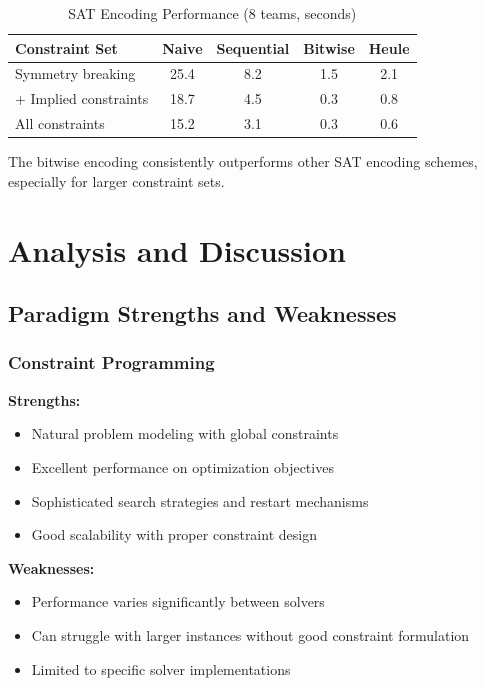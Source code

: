\documentclass[11pt]{article}
\begin{document}
\begin{table}[H]
\centering
\caption{SAT Encoding Performance (8 teams, seconds)}
\label{tab:sat_encodings}
\begin{tabular}{@{}lcccc@{}}
\toprule
\textbf{Constraint Set} & \textbf{Naive} & \textbf{Sequential} & \textbf{Bitwise} & \textbf{Heule} \\
\midrule
Symmetry breaking       & 25.4 & 8.2  & 1.5  & 2.1  \\
+ Implied constraints   & 18.7 & 4.5  & 0.3  & 0.8  \\
All constraints         & 15.2 & 3.1  & 0.3  & 0.6  \\
\bottomrule
\end{tabular}
\end{table}

The bitwise encoding consistently outperforms other SAT encoding schemes, especially for larger constraint sets.

\section{Analysis and Discussion}

\subsection{Paradigm Strengths and Weaknesses}

\subsubsection{Constraint Programming}
\textbf{Strengths:}
\begin{itemize}
    \item Natural problem modeling with global constraints
    \item Excellent performance on optimization objectives
    \item Sophisticated search strategies and restart mechanisms
    \item Good scalability with proper constraint design
\end{itemize}

\textbf{Weaknesses:}
\begin{itemize}
    \item Performance varies significantly between solvers
    \item Can struggle with larger instances without good constraint formulation
    \item Limited to specific solver implementations
\end{itemize}
\end{document}
